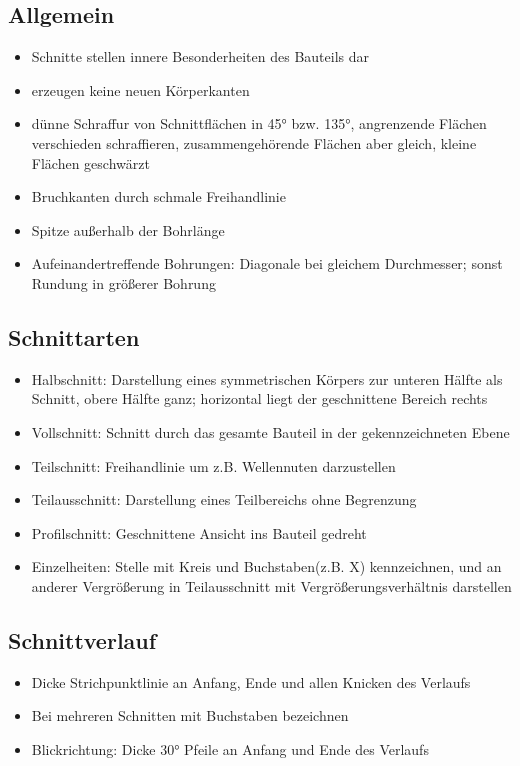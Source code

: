\documentclass[a4paper,parskip=half*,DIV=7,fontsize=11pt]{scrartcl}
\begin{document}
\subsection{Allgemein}
\begin{itemize}
	\item Schnitte stellen innere Besonderheiten des Bauteils dar
	\item erzeugen keine neuen Körperkanten
	\item dünne Schraffur von Schnittflächen in 45° bzw. 135°, angrenzende Flächen verschieden schraffieren, zusammengehörende Flächen aber gleich, kleine Flächen geschwärzt
	\item Bruchkanten durch schmale Freihandlinie
	\item Spitze außerhalb der Bohrlänge
	\item Aufeinandertreffende Bohrungen: Diagonale bei gleichem Durchmesser; sonst Rundung in größerer Bohrung
\end{itemize}
		
\subsection{Schnittarten}
\begin{itemize}
	\item Halbschnitt: Darstellung eines symmetrischen Körpers zur unteren Hälfte als Schnitt, obere Hälfte ganz; horizontal liegt der geschnittene Bereich rechts
	\item Vollschnitt: Schnitt durch das gesamte Bauteil in der gekennzeichneten Ebene
	\item Teilschnitt: Freihandlinie um z.B. Wellennuten darzustellen
	\item Teilausschnitt: Darstellung eines Teilbereichs ohne Begrenzung
	\item Profilschnitt: Geschnittene Ansicht ins Bauteil gedreht
	\item Einzelheiten: Stelle mit Kreis und Buchstaben(z.B. X) kennzeichnen, und an anderer Vergrößerung in Teilausschnitt mit Vergrößerungsverhältnis darstellen 
\end{itemize}

\subsection{Schnittverlauf}
\begin{itemize}
	\item Dicke Strichpunktlinie an Anfang, Ende und allen Knicken des Verlaufs
	\item Bei mehreren Schnitten mit Buchstaben bezeichnen
	\item Blickrichtung: Dicke 30° Pfeile an Anfang und Ende des Verlaufs
\end{itemize}
		
\end{document}
